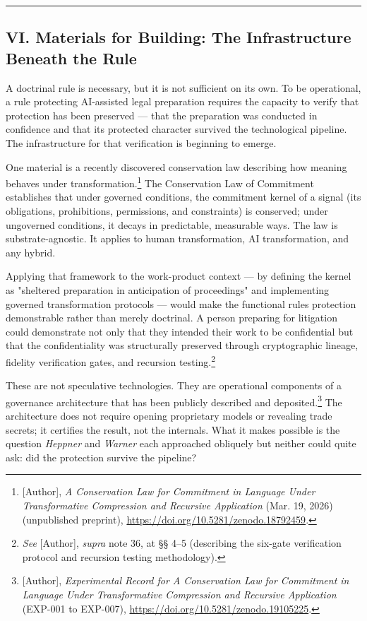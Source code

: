 \documentclass[
  12pt,
]{article}
\begin{document}
\begin{center}\rule{0.5\linewidth}{0.5pt}\end{center}

\subsection{VI. Materials for Building: The Infrastructure Beneath the
Rule}\label{vi-materials-for-building-the-infrastructure-beneath-the-rule}

A doctrinal rule is necessary, but it is not sufficient on its own. To
be operational, a rule protecting AI-assisted legal preparation requires
the capacity to verify that protection has been preserved --- that the
preparation was conducted in confidence and that its protected character
survived the technological pipeline. The infrastructure for that
verification is beginning to emerge.

One material is a recently discovered conservation law describing how
meaning behaves under transformation.\footnote{{[}Author{]}, \emph{A
  Conservation Law for Commitment in Language Under Transformative
  Compression and Recursive Application} (Mar. 19, 2026) (unpublished
  preprint), \url{https://doi.org/10.5281/zenodo.18792459}.} The
Conservation Law of Commitment establishes that under governed
conditions, the commitment kernel of a signal (its obligations,
prohibitions, permissions, and constraints) is conserved; under
ungoverned conditions, it decays in predictable, measurable ways. The
law is substrate-agnostic. It applies to human transformation, AI
transformation, and any hybrid.

Applying that framework to the work-product context --- by defining the
kernel as "sheltered preparation in anticipation of proceedings" and
implementing governed transformation protocols --- would make the
functional rule\textquotesingle s protection demonstrable rather than
merely doctrinal. A person preparing for litigation could demonstrate not only
that they intended their work to be confidential but that the
confidentiality was structurally preserved through cryptographic
lineage, fidelity verification gates, and recursion testing.\footnote{\emph{See}
  {[}Author{]}, \emph{supra} note 36, at §§ 4--5 (describing the
  six-gate verification protocol and recursion testing methodology).}

These are not speculative technologies. They are operational components
of a governance architecture that has been publicly described and
deposited.\footnote{{[}Author{]}, \emph{Experimental Record for A
  Conservation Law for Commitment in Language Under Transformative
  Compression and Recursive Application} (EXP-001 to EXP-007),
  \url{https://doi.org/10.5281/zenodo.19105225}.} The architecture does
not require opening proprietary models or revealing trade secrets; it
certifies the result, not the internals. What it makes possible is the
question \emph{Heppner} and \emph{Warner} each approached obliquely but
neither could quite ask: did the protection survive the pipeline?
\end{document}
